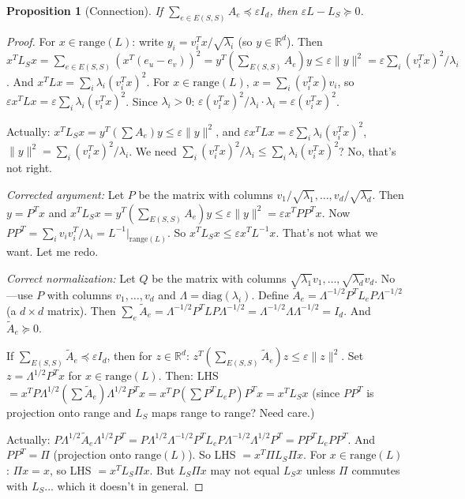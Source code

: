 \documentclass{article}
\newtheorem{proposition}[theorem]{Proposition}
\theoremstyle{definition}
\begin{document}
\begin{proposition}[Connection]\label{prop:connect}
If $\sum_{e \in E(S,S)} A_e \preceq \varepsilon I_d$, then $\varepsilon L - L_S \succeq 0$.
\end{proposition}
\begin{proof}
For $x \in \mathrm{range}(L)$: write $y_i = v_i^T x / \sqrt{\lambda_i}$ (so $y \in \mathbb{R}^d$).
Then $x^T L_S x = \sum_{e \in E(S,S)} (x^T(e_u - e_v))^2 = y^T (\sum_{E(S,S)} A_e) y
\le \varepsilon \|y\|^2 = \varepsilon \sum_i (v_i^T x)^2 / \lambda_i$.
And $x^T L x = \sum_i \lambda_i (v_i^T x)^2$. For $x \in \mathrm{range}(L)$,
$x = \sum_i (v_i^T x) v_i$, so $\varepsilon x^T L x = \varepsilon \sum_i \lambda_i (v_i^T x)^2$.
Since $\lambda_i > 0$: $\varepsilon (v_i^T x)^2 / \lambda_i \cdot \lambda_i = \varepsilon (v_i^T x)^2$.

Actually: $x^T L_S x = y^T(\sum A_e)y \le \varepsilon \|y\|^2$, and
$\varepsilon x^T L x = \varepsilon \sum_i \lambda_i (v_i^T x)^2$,
$\|y\|^2 = \sum_i (v_i^T x)^2/\lambda_i$.
We need $\sum_i (v_i^T x)^2/\lambda_i \le \sum_i \lambda_i (v_i^T x)^2$?
No, that's not right.

\emph{Corrected argument:} Let $P$ be the matrix with columns $v_1/\sqrt{\lambda_1}, \ldots, v_d/\sqrt{\lambda_d}$.
Then $y = P^T x$ and $x^T L_S x = y^T (\sum_{E(S,S)} A_e) y \le \varepsilon \|y\|^2 = \varepsilon x^T P P^T x$.
Now $PP^T = \sum_i v_i v_i^T / \lambda_i = L^{-1}|_{\mathrm{range}(L)}$. So
$x^T L_S x \le \varepsilon x^T L^{-1} x$.
That's not what we want. Let me redo.

\emph{Correct normalization:} Let $Q$ be the matrix with columns $\sqrt{\lambda_1} v_1, \ldots, \sqrt{\lambda_d} v_d$.
No---use $P$ with columns $v_1, \ldots, v_d$ and $\Lambda = \mathrm{diag}(\lambda_i)$.
Define $\tilde{A}_e = \Lambda^{-1/2} P^T L_e P \Lambda^{-1/2}$ (a $d \times d$ matrix).
Then $\sum_e \tilde{A}_e = \Lambda^{-1/2} P^T L P \Lambda^{-1/2} = \Lambda^{-1/2} \Lambda \Lambda^{-1/2} = I_d$.
And $\tilde{A}_e \succeq 0$.

If $\sum_{E(S,S)} \tilde{A}_e \preceq \varepsilon I_d$, then for $z \in \mathbb{R}^d$:
$z^T (\sum_{E(S,S)} \tilde{A}_e) z \le \varepsilon \|z\|^2$.
Set $z = \Lambda^{1/2} P^T x$ for $x \in \mathrm{range}(L)$. Then:
LHS $= x^T P \Lambda^{1/2} (\sum \tilde{A}_e) \Lambda^{1/2} P^T x = x^T P (\sum P^T L_e P) P^T x = x^T L_S x$
(since $P P^T$ is projection onto range and $L_S$ maps range to range? Need care.)

Actually: $P \Lambda^{1/2} \tilde{A}_e \Lambda^{1/2} P^T = P \Lambda^{1/2} \Lambda^{-1/2} P^T L_e P \Lambda^{-1/2} \Lambda^{1/2} P^T = P P^T L_e P P^T$.
And $PP^T = \Pi$ (projection onto $\mathrm{range}(L)$).
So LHS $= x^T \Pi L_S \Pi x$. For $x \in \mathrm{range}(L)$: $\Pi x = x$, so LHS $= x^T L_S \Pi x$.
But $L_S \Pi x$ may not equal $L_S x$ unless $\Pi$ commutes with $L_S$... which it doesn't in general.


\end{proof}
\end{document}
